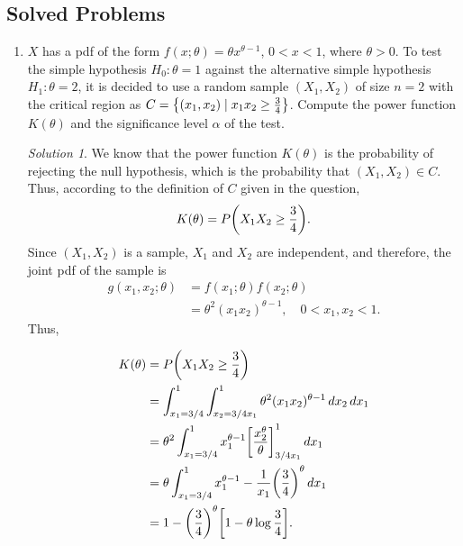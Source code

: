 \documentclass[svgnames, a5paper]{article}
\theoremstyle{definition}
\theoremstyle{remark}
\newtheorem*{Solution*}{Solution}
\begin{document}
\subsection{Solved Problems}\label{subsec:SolvedProblems1}
\begin{enumerate}
\item $X$ has a pdf of the form $f(x; \theta) = \theta x^{\theta - 1}$, $0 < x < 1$, where $\theta > 0$. To test the simple hypothesis $H_0 \colon \theta = 1$ against the alternative simple hypothesis $H_1 \colon \theta = 2$, it is decided to use a random sample $(X_1, X_2)$ of size $n = 2$ with the critical region as $C = \qty{ (x_1, x_2) \mid x_1 x_2 \ge \frac 3 4 }$. Compute the power function $K(\theta)$ and the significance level $\alpha$ of the test.
\begin{Solution*}
We know that the power function $K(\theta)$ is the probability of rejecting the null hypothesis, which is the probability that $(X_1, X_2) \in C$. Thus, according to the definition of $C$ given in the question,
\begin{align*}
K(\theta) = P\pqty{ X_1 X_2 \ge \frac 3 4 }.
\end{align*}
Since $(X_1, X_2)$ is a sample, $X_1$ and $X_2$ are independent, and therefore, the joint pdf of the sample is
\begin{align*}
g(x_1, x_2; \theta) &= f(x_1; \theta) f(x_2; \theta) \\
	&= \theta^2 (x_1 x_2)^{\theta - 1}, \quad 0 < x_1, x_2 < 1.
\end{align*}
Thus,\\
\begin{minipage}[h]{0.5\linewidth}\small
\begin{align*}
K(\theta) & = P\pqty{ X_1 X_2 \ge \frac 3 4 } \\
	&= \int_{x_1 = 3/4}^1 \int_{x_2 = 3/4x_1}^1 \theta^2 (x_1 x_2)^{\theta - 1} \,dx_2 \,dx_1\\
	&= \theta^2 \int_{x_1 = 3/4}^1 x_1^{\theta - 1} \bqty{\dfrac{x_2^\theta}{\theta}}_{3/4x_1}^1 \,dx_1\\
	&= \theta \int_{x_1 = 3/4}^1 x_1^{\theta - 1} - \dfrac 1 {x_1} \pqty{\dfrac 3 4}^\theta \,dx_1\\
	&= 1 - \pqty{\dfrac 3 4}^\theta \bqty{1 - \theta \log \dfrac 3 4 }.
\end{align*}
\end{minipage}\quad
\begin{minipage}{0.4\linewidth}

\end{minipage}
\end{Solution*}
\end{enumerate}
\end{document}
